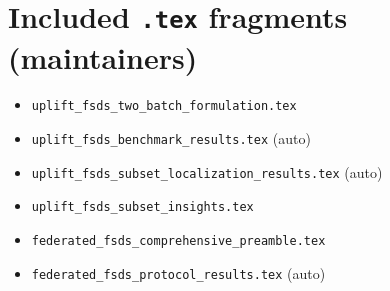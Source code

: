 \documentclass[11pt]{article}
\begin{document}
\section{Included \texttt{.tex} fragments (maintainers)}
\begin{itemize}\itemsep2pt
  \item \texttt{uplift\_fsds\_two\_batch\_formulation.tex}
  \item \texttt{uplift\_fsds\_benchmark\_results.tex} (auto)
  \item \texttt{uplift\_fsds\_subset\_localization\_results.tex} (auto)
  \item \texttt{uplift\_fsds\_subset\_insights.tex}
  \item \texttt{federated\_fsds\_comprehensive\_preamble.tex}
  \item \texttt{federated\_fsds\_protocol\_results.tex} (auto)
\end{itemize}
\end{document}
